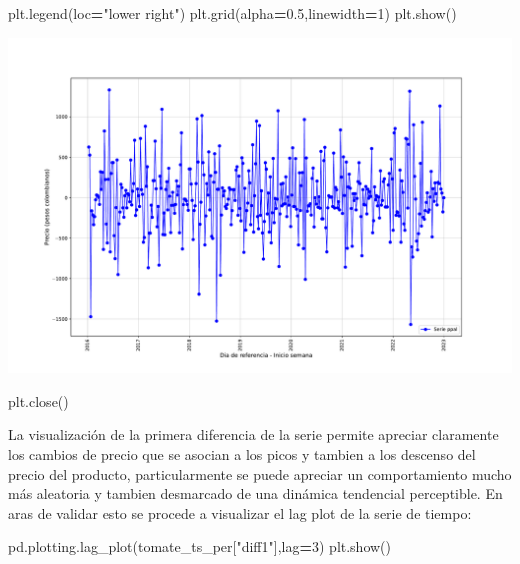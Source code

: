 \documentclass[
]{book}
\newenvironment{Shaded}{\begin{snugshade}}{\end{snugshade}}
\newcommand{\DecValTok}[1]{\textcolor[rgb]{0.00,0.00,0.81}{#1}}
\newcommand{\FloatTok}[1]{\textcolor[rgb]{0.00,0.00,0.81}{#1}}
\newcommand{\NormalTok}[1]{#1}
\newcommand{\OperatorTok}[1]{\textcolor[rgb]{0.81,0.36,0.00}{\textbf{#1}}}
\newcommand{\StringTok}[1]{\textcolor[rgb]{0.31,0.60,0.02}{#1}}
\begin{document}
\begin{Shaded}
\begin{Highlighting}[]
\NormalTok{plt.legend(loc}\OperatorTok{=}\StringTok{"lower right"}\NormalTok{)}
\NormalTok{plt.grid(alpha}\OperatorTok{=}\FloatTok{0.5}\NormalTok{,linewidth}\OperatorTok{=}\DecValTok{1}\NormalTok{)}
\NormalTok{plt.show()}
\end{Highlighting}
\end{Shaded}

\includegraphics{bookdown-demo_files/figure-latex/unnamed-chunk-124-113.pdf}

\begin{Shaded}
\begin{Highlighting}[]
\NormalTok{plt.close()}
\end{Highlighting}
\end{Shaded}

La visualización de la primera diferencia de la serie permite apreciar claramente los cambios de precio que se asocian a los picos y tambien a los descenso del precio del producto, particularmente se puede apreciar un comportamiento mucho más aleatoria y tambien desmarcado de una dinámica tendencial perceptible. En aras de validar esto se procede a visualizar el lag plot de la serie de tiempo:

\begin{Shaded}
\begin{Highlighting}[]

\NormalTok{pd.plotting.lag\_plot(tomate\_ts\_per[}\StringTok{"diff1"}\NormalTok{],lag}\OperatorTok{=}\DecValTok{3}\NormalTok{)}
\NormalTok{plt.show()}
\end{Highlighting}
\end{Shaded}
\end{document}
